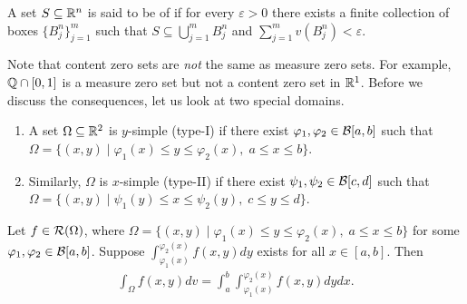 \begin{definition}
    A set $S \subseteq \mathbb{R}^{n}$ is said to be of  if for every $\varepsilon > 0$ there exists a finite collection of boxes $\{B_{j}^{n}\}_{j = 1}^{m}$ such that $S \subseteq \bigcup_{j=1}^{m} B_{j}^{n}$ and $\sum_{j=1}^{m} v(B_{j}^{n}) < \varepsilon$.
\end{definition}

Note that content zero sets are \textit{not} the same as measure zero sets. For example, $\mathbb{Q} \cap [0,1]$ is a measure zero set but not a content zero set in $\mathbb{R}^{1}$. Before we discuss the consequences, let us look at two special domains.

\begin{enumerate}
    \item A set $\Omega \subseteq \mathbb{R}^{2}$ is $y$-simple (type-I) if there exist $\varphi_{1},\varphi_{2} \in \mathcal{B}[a,b]$ such that $\Omega = \{(x,y) \mid \varphi_{1}(x) \leq y \leq \varphi_{2}(x),\; a \leq x \leq b\}$. 
    \item Similarly, $\Omega$ is $x$-simple (type-II) if there exist $\psi_{1},\psi_{2} \in \mathcal{B}[c,d]$ such that $\Omega = \{(x,y) \mid \psi_{1}(y) \leq x \leq \psi_{2}(y),\; c \leq y \leq d\}$.
\end{enumerate}

\begin{theorem}
    Let $f \in \mathcal{R}(\Omega)$, where $\Omega = \{(x,y) \mid \varphi_{1}(x) \leq y \leq \varphi_{2}(x),\;a \leq x \leq b\}$ for some $\varphi_{1},\varphi_{2} \in \mathcal{B}[a,b]$. Suppose $\int_{\varphi_{1}(x)}^{\varphi_{2}(x)} f(x,y) dy$ exists for all $x \in [a,b]$. Then
    \begin{align}
        \int_{\Omega} f(x,y) dv = \int_{a}^{b} \int_{\varphi_{1}(x)}^{\varphi_{2}(x)} f(x,y) dy dx.
    \end{align}
\end{theorem}